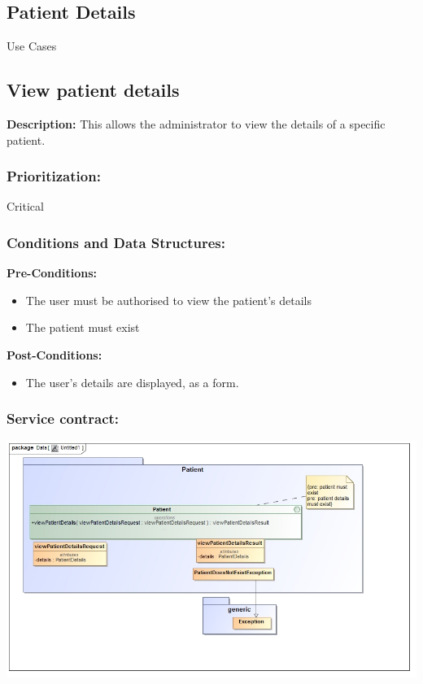 \newpage
\setlength{\voffset}{-3cm}

\begin{center}
\section{\textbf{\huge{Patient Details}}}

\Large{Use Cases}
\end{center}


\subsection{View patient details}
\textbf{Description:}
This allows the administrator to view the details of a specific patient.
\subsubsection{Prioritization:}
Critical
\subsubsection{Conditions and Data Structures:}
\textbf{Pre-Conditions:}
\begin{itemize}
	\item The user must be authorised to view the patient's details
	\item The patient must exist
\end{itemize}

\textbf{Post-Conditions:}	
\begin{itemize}
	\item The user's details are displayed, as a form.
\end{itemize}

\subsubsection{Service contract:}
\includegraphics[width=1\linewidth]{./Graphics/1.jpg}

